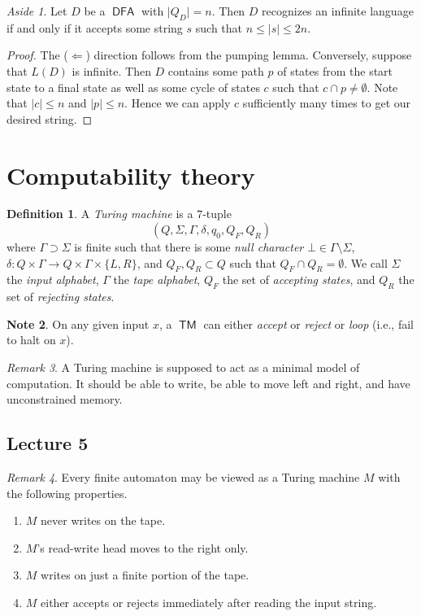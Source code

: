 \documentclass[10pt,letterpaper,cm]{nupset}
\theoremstyle{definition}
\newtheorem{definition}{Definition}[subsection]
\newtheorem{note}[definition]{Note}
\theoremstyle{theorem}
\theoremstyle{remark}
\newtheorem{remark}[definition]{Remark}
\newtheorem*{aside}{Aside}
\newcommand{\1}{\mathbf{1}}
\newcommand{\0}{\vec 0}
\DeclareMathOperator{\TM}{\mathsf{TM}}
\DeclareMathOperator{\DFA}{\mathsf{DFA}}
\begin{document}
\begin{aside}
Let $D$ be a $\DFA$ with $\lvert{Q_D}\rvert =n$. Then $D$ recognizes an infinite language if and only if it accepts some string $s$ such that $n\leq \lvert{s}\rvert \leq 2n$.
\end{aside}
\begin{proof}
The ($\Longleftarrow$) direction follows from the pumping lemma. Conversely, suppose that $L(D)$ is infinite. Then $D$ contains some path $p$ of states from the start state to a final state as well as some cycle of states $c$ such that $c \cap p \ne \emptyset$. Note that $\lvert{c}\rvert \leq n$ and $\lvert{p}\rvert \leq n$. Hence we can apply $c$ sufficiently many times to get our desired string.
\end{proof}

\section{Computability theory}

\begin{definition}
A \textit{Turing machine} is a $7$-tuple $$(Q, \Sigma, \Gamma, \delta, q_0, Q_F, Q_R)$$ where $\Gamma \supset \Sigma$ is finite such that there is some \textit{null character} $\bot \in \Gamma \setminus \Sigma$, $\delta : Q\times \Gamma \to Q \times \Gamma \times \{L, R\}$, and $Q_F, Q_R \subset Q$ such that $Q_F \cap Q_R = \emptyset$. We call $\Sigma$ the \textit{input alphabet}, $\Gamma$ the \textit{tape alphabet}, $Q_F$ the set of \textit{accepting states}, and $Q_R$ the set of \textit{rejecting states}.
\end{definition}

\begin{note}
On any given input $x$, a $\TM$ can either \textit{accept} or \textit{reject} or \textit{loop} (i.e., fail to halt on $x$).
\end{note}

\begin{remark}
A Turing machine is supposed to act as a minimal model of computation. It should be able to write, be able to move left and right, and have unconstrained memory.
\end{remark}

\subsection{Lecture 5}

\begin{remark}
Every finite automaton may be viewed as a Turing machine $M$ with the following properties. 
\begin{enumerate}[label=(\alph*)]
\item $M$ never writes on the tape.
\item $M$'s read-write head moves to the right only.
\item $M$ writes on just a finite portion of the tape.
\item $M$ either accepts or rejects immediately after reading the input string. 
\end{enumerate}
\end{remark}
\end{document}
